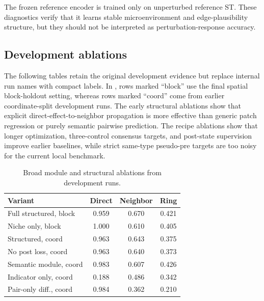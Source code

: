 \documentclass[sigconf,review,balance=false]{acmart}
\begin{document}
The frozen reference encoder is trained only on unperturbed reference ST. These diagnostics verify that it learns stable microenvironment and edge-plausibility structure, but they should not be interpreted as perturbation-response accuracy.

\subsection{Development ablations}
\label{app:development_ablations}

The following tables retain the original development evidence but replace internal run names with compact labels. In , rows marked ``block'' use the final spatial block-holdout setting, whereas rows marked ``coord'' come from earlier coordinate-split development runs. The early structural ablations show that explicit direct-effect-to-neighbor propagation is more effective than generic patch regression or purely semantic pairwise prediction. The recipe ablations show that longer optimization, three-control consensus targets, and post-state supervision improve earlier baselines, while strict same-type pseudo-pre targets are too noisy for the current local benchmark.

\begin{table}[t]
\centering
\caption{Broad module and structural ablations from development runs.}
\label{tab:app_ablation_modules}
\scriptsize
\setlength{\tabcolsep}{3pt}
\renewcommand{\arraystretch}{1.14}
\begin{tabular}{@{}lccc@{}}
\toprule
Variant & Direct & Neighbor & Ring \\
\midrule
Full structured, block & 0.959 & 0.670 & 0.421 \\
Niche only, block & 1.000 & 0.610 & 0.405 \\
Structured, coord & 0.963 & 0.643 & 0.375 \\
No post loss, coord & 0.963 & 0.640 & 0.373 \\
Semantic module, coord & 0.983 & 0.607 & 0.426 \\
Indicator only, coord & 0.188 & 0.486 & 0.342 \\
Pair-only diff., coord & 0.984 & 0.362 & 0.210 \\
\bottomrule
\end{tabular}
\end{table}
\end{document}
